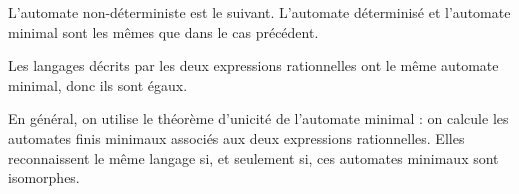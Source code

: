 \begin{corrections}
\begin{questions}
  \item {}

  \item L'automate non-déterministe est le suivant. L'automate déterminisé et l'automate minimal sont les mêmes que dans le cas précédent.

  \item Les langages décrits par les deux expressions rationnelles ont le même automate minimal, donc ils sont égaux. 

  \item En général, on utilise le théorème d’unicité de l’automate minimal :
  on calcule les automates finis minimaux associés aux deux expressions rationnelles.
  Elles reconnaissent le même langage si, et seulement si, ces automates minimaux sont isomorphes.

  \end{questions}

\end{corrections}

\endgroup
\endinput
